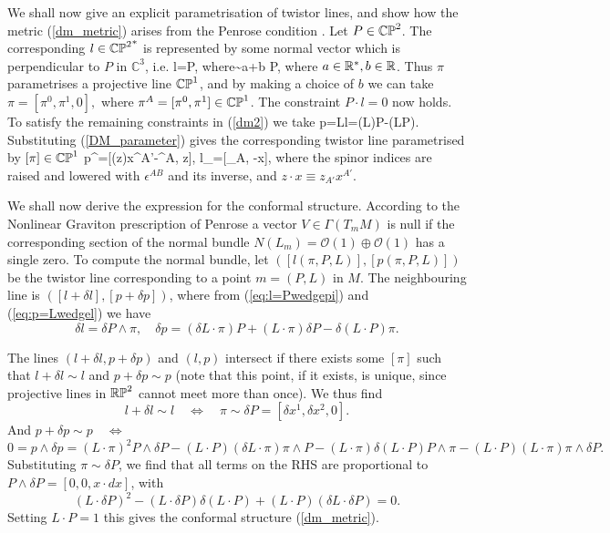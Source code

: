 We shall now give an explicit parametrisation of twistor lines, and show how 
the metric (\ref{dm_metric}) arises from the Penrose condition 
\cite{penrose, ward}.
Let $P\in \mathbb{CP}^2$. The corresponding $l\in {\mathbb{CP}^2}^*$ is represented by some normal vector which is perpendicular to $P$ in $\mathbb{C}^3$, i.e.
\be \label{eq:l=Pwedgepi}
l=P\wedge \pi, \quad \mbox{where}\quad  \pi\sim a\pi+b P,
\ee
where $a\in \mathbb{R}^*, b\in \mathbb{R}$.  Thus $\pi$ parametrises a projective line $\mathbb{CP}^1$,
and by making a choice of $b$ we can take
$
\pi=[\pi^0, \pi^1, 0], 
$ where $\pi^A=[\pi^0, \pi^1]\in \mathbb{CP}^1$. The constraint $P\cdot l=0$ now holds.
To satisfy the remaining constraints in (\ref{dm2}) we take
\be \label{eq:p=Lwedgel}
p=L\wedge l=(L\cdot\pi)P-(L\cdot P)\pi.
\ee
Substituting (\ref{DM_parameter}) gives 
the corresponding twistor line parametrised by $[\pi]\in\mathbb{CP}^1$ 
\be
\label{sl3curves}
p^{\alpha}=[(z\cdot \pi)x^{A'}-\pi^A, z\cdot \pi], \quad l_\alpha=[\pi_A, -\pi\cdot x],
\ee
where the spinor indices are raised and lowered with $\epsilon^{AB}$ and its inverse, and  $z\cdot x\equiv z_{A'}x^{A'}$. 

We shall now derive the expression for the conformal structure. According
to the Nonlinear Graviton prescription of Penrose \cite{penrose} a vector
$V\in \Gamma(T_mM)$ is null if the corresponding section
of the normal bundle $N(L_m)={\mathcal O}(1)\oplus{\mathcal O}(1)$ has a 
single zero. To compute the normal bundle, let $([l(\pi, P, L)], 
[p(\pi, P, L)])$
be the twistor line corresponding to a point $m=(P, L)$ in $M$. The neighbouring line is $([l+\delta l], [p+\delta p])$, where from (\ref{eq:l=Pwedgepi}) and (\ref{eq:p=Lwedgel}) we have
\[
\delta l=\delta P\wedge \pi, \quad
\delta p= (\delta L\cdot \pi)P+(L\cdot\pi) \delta P-\delta (L\cdot P)\pi.
\]

The lines  $(l+\delta l, p+\delta p)$  and $(l, p)$ intersect if there exists some $[\pi]$ such that $l+\delta l\sim l$ and $p+\delta p\sim p$ (note that this point, if it exists, is unique, since projective lines in $\mathbb{RP}^2$ cannot meet more than once). We thus find
\[
l+\delta l\sim l \quad \iff \quad\pi\sim\delta P=[\delta x^1, \delta x^2, 0].
\]
And $p+\delta p\sim p \quad \iff$
\[
0=p\wedge \delta p=(L\cdot \pi)^2P\wedge \delta P-(L\cdot P)
(\delta L\cdot \pi)\pi\wedge P-(L\cdot \pi)\delta (L\cdot P)P\wedge \pi-
(L\cdot P)(L\cdot \pi) \pi\wedge \delta P.
\]
Substituting $\pi\sim\delta P$, we find that all terms on the RHS are proportional to $P\wedge \delta P=[0, 0, x\cdot dx]$, with
\[
(L\cdot \delta P)^2-(L\cdot \delta P)\delta(L\cdot P)+(L\cdot P)(\delta L\cdot \delta P)=0.
\]
Setting $L\cdot P=1$ this gives the conformal structure 
(\ref{dm_metric}).
